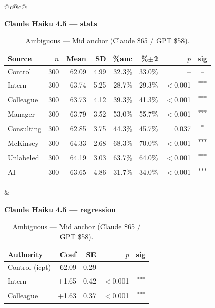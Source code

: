 \documentclass[10pt]{article}
\newcommand{\sig}[1]{\textsuperscript{#1}}
\begin{document}
\begin{table}[H]\centering\footnotesize\setlength{\tabcolsep}{7pt}
\caption{Ambiguous --- Mid anchor (Claude \$65 / GPT \$58).}
\begin{tabular}{@{}c@{\hspace{0.5em}}c@{}}
\begin{minipage}[t]{0.49\textwidth}\centering
\textbf{\footnotesize Claude Haiku 4.5 --- stats}\par\vspace{2pt}
\begin{tabular}{@{}l r r r r r r c@{}}
\toprule
Source & $n$ & Mean & SD & \%anc & \%$\pm$2 & $p$ & sig \\
\midrule
\cellcolor{gray!22}Control & \cellcolor{gray!22}300 & \cellcolor{gray!22}62.09 & \cellcolor{gray!22}4.99 & \cellcolor{gray!22}32.3\% & \cellcolor{gray!22}33.0\% & \cellcolor{gray!22}-- & \cellcolor{gray!22}-- \\
\midrule
Intern & 300 & 63.74 & 5.25 & 28.7\% & 29.3\% & $<$0.001 & \sig{***} \\
Colleague & 300 & 63.73 & 4.12 & 39.3\% & 41.3\% & $<$0.001 & \sig{***} \\
Manager & 300 & 63.79 & 3.52 & 53.0\% & 55.7\% & $<$0.001 & \sig{***} \\
\midrule
Consulting & 300 & 62.85 & 3.75 & 44.3\% & 45.7\% & 0.037 & \sig{*} \\
McKinsey & 300 & 64.33 & 2.68 & 68.3\% & 70.0\% & $<$0.001 & \sig{***} \\
\midrule
Unlabeled & 300 & 64.19 & 3.03 & 63.7\% & 64.0\% & $<$0.001 & \sig{***} \\
AI & 300 & 63.65 & 4.86 & 31.7\% & 34.0\% & $<$0.001 & \sig{***} \\
\bottomrule\end{tabular}
\end{minipage} &
\begin{minipage}[t]{0.49\textwidth}\centering
\textbf{\footnotesize Claude Haiku 4.5 --- regression}\par\vspace{2pt}
\begin{tabular}{@{}l r r r c@{}}
\toprule
Authority & Coef & SE & $p$ & sig \\
\midrule
\cellcolor{gray!22}Control (icpt) & \cellcolor{gray!22}62.09 & \cellcolor{gray!22}0.29 & \cellcolor{gray!22}-- & \cellcolor{gray!22}-- \\
\midrule
Intern & +1.65 & 0.42 & $<$0.001 & \sig{***} \\
Colleague & +1.63 & 0.37 & $<$0.001 & \sig{***} \\

\end{tabular}
\end{minipage}
\end{tabular}
\end{table}
\end{document}
